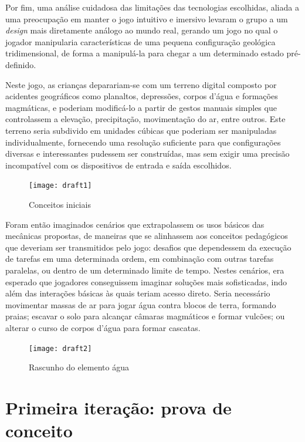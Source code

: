 Por fim, uma análise cuidadosa das limitações das tecnologias escolhidas, aliada a uma preocupação em manter o jogo intuitivo e imersivo levaram o grupo a um \textit{design} mais diretamente análogo ao mundo real, gerando um jogo no qual o jogador manipularia características de uma pequena configuração geológica tridimensional, de forma a manipulá-la para chegar a um determinado estado pré-definido.

Neste jogo, as crianças deparariam-se com um terreno digital composto por acidentes geográficos como planaltos, depressões, corpos d'água e formações magmáticas, e poderiam modificá-lo a partir de gestos manuais simples que controlassem a elevação, precipitação, movimentação do ar, entre outros. Este terreno seria subdivido em unidades cúbicas que poderiam ser manipuladas individualmente, fornecendo uma resolução suficiente para que configurações diversas e interessantes pudessem ser construídas, mas sem exigir uma precisão incompatível com os dispositivos de entrada e saída escolhidos.

\begin{figure}[h]
	\centering
	\caption{Conceitos iniciais}
	\texttt{[image: draft1]}
	\legend{\fonteAP}
\end{figure}

Foram então imaginados cenários que extrapolassem os usos básicos das mecânicas propostas, de maneiras que se alinhassem aos conceitos pedagógicos que deveriam ser transmitidos pelo jogo: desafios que dependessem da execução de tarefas em uma determinada ordem, em combinação com outras tarefas paralelas, ou dentro de um determinado limite de tempo. Nestes cenários, era esperado que jogadores conseguissem imaginar soluções mais sofisticadas, indo além das interações básicas às quais teriam acesso direto. Seria necessário movimentar massas de ar para jogar água contra blocos de terra, formando praias; escavar o solo para alcançar câmaras magmáticos e formar vulcões; ou alterar o curso de corpos d'água para formar cascatas.


\begin{figure}[htb]
	\centering
	\caption{Rascunho do elemento água}
	\texttt{[image: draft2]}
	\legend{\fonteAP}
\end{figure}

\section{Primeira iteração: prova de conceito}\label{sec-primeira-iteracao-prova-conceito}

